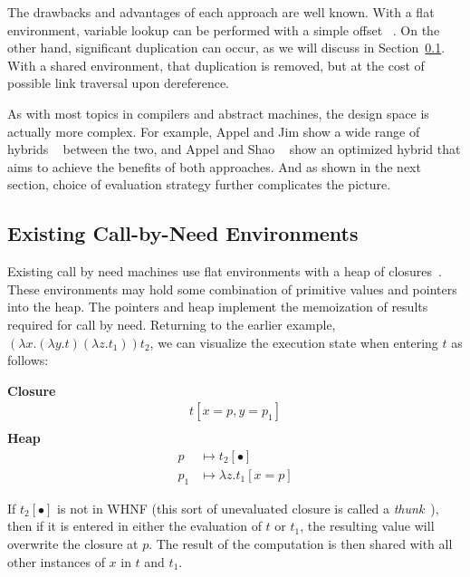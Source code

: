 The drawbacks and advantages of each approach are well known. With a flat
environment, variable lookup can be performed with a simple offset
~\cite{jonesstg,appel2006compiling}. On the other hand, significant
duplication can occur, as we will discuss in Section~\ref{sec:exist}.
With a shared environment, that duplication is removed, but at the cost of
possible link traversal upon dereference. 

As with most topics in compilers and abstract machines, the design space is
actually more complex. For example, Appel and Jim show a wide range of hybrids
~\cite{appel1988optimizing} between the two, and Appel and Shao
~\cite{shao1994space} show an optimized hybrid that aims to achieve the benefits
of both approaches. And as shown in the next section, choice of evaluation
strategy further complicates the picture.

\subsection{Existing Call-by-Need Environments} \label{sec:exist}

Existing call by need machines use flat environments with a heap of
closures~\cite{jonesstg,TIM,johnsson1984efficient,boquist1997grin}. These
environments may hold some combination of primitive values and pointers into the
heap. The pointers and heap implement the memoization of results required for
call by need. Returning to the earlier example, $(\lambda x.(\lambda y.t)
(\lambda z.t_1)) t_2$, we can visualize the execution state when entering $t$ as
follows:

\begin{center}
\textbf{Closure}
\begin{align*}
t[x=p, y=p_1] \\
\end{align*}
\textbf{Heap}
\begin{align*}
p &\mapsto t_2[\bullet] \\
p_1 &\mapsto \lambda z.t_1[x=p] 
\end{align*}
\end{center}

If $t_2[\bullet]$ is not in WHNF (this sort of unevaluated closure is called a
\emph{thunk}~\cite{ingerman1961way,peyton1992implementing}), then if it is
entered in either the evaluation of $t$ or $t_1$, the resulting value will
overwrite the closure at $p$. The result of the computation is then shared with
all other instances of $x$ in $t$ and $t_1$. 


